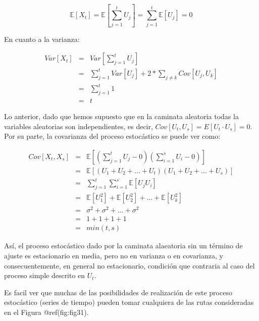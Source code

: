 \documentclass[
  a4paper,
]{article}
\begin{document}
\[
\mathbb{E}[X_t] = \mathbb{E}\left[ \sum^t_{j=1} U_j \right] = \sum^t_{j=1} \mathbb{E}[U_j] = 0
\]

En cuanto a la varianza:

\begin{eqnarray}
  Var[X_t] & = & Var \left[ \sum^t_{j=1} U_j \right] \nonumber \\
  & = & \sum^t_{j=1} Var[U_j] + 2 * \sum_{j \neq k} Cov[U_j,U_k] \nonumber \\
  & = & \sum^t_{j=1} 1 \nonumber \\
  & = & t    
\end{eqnarray}

Lo anterior, dado que hemos supuesto que en la caminata aleatoria todas
la variables aleatorias son independientes, es decir,
\(Cov[U_t,U_s] = E[U_t \cdot U_s] = 0\). Por su parte, la covarianza del
proceso estocástico se puede ver como:

\begin{eqnarray*}
  Cov[X_t,X_s] & = & \mathbb{E} \left[ \left( \sum^t_{j=1} U_j - 0 \right) \left( \sum^s_{i=1} U_i - 0 \right) \right] \\
  & = & \mathbb{E}[(U_1 + U_2 + \ldots + U_t)(U_1 + U_2 + \ldots + U_s)] \\
  & = & \sum^t_{j=1} \sum^s_{i=1} \mathbb{E}[U_j U_i] \\
  & = & \mathbb{E}[U^2_1] + \mathbb{E}[U^2_2] + \ldots + \mathbb{E}[U^2_k] \\
  & = & \sigma^2 + \sigma^2 + \ldots + \sigma^2 \\
  & = & 1 + 1 + 1 + 1 \\
  & = & min(t,s)
\end{eqnarray*}

Así, el proceso estocástico dado por la caminata alaeatoria sin un
término de ajuste es estacionario en media, pero no en varianza o en
covarianza, y consecuentemente, en general no estacionario, condición
que contraria al caso del proceso simple descrito en \(U_t\).

Es facil ver que muchas de las posibilidades de realización de este
proceso estocástico (series de tiempo) pueden tomar cualquiera de las
rutas consideradas en el Figura @ref(fig:fig31).
\end{document}
